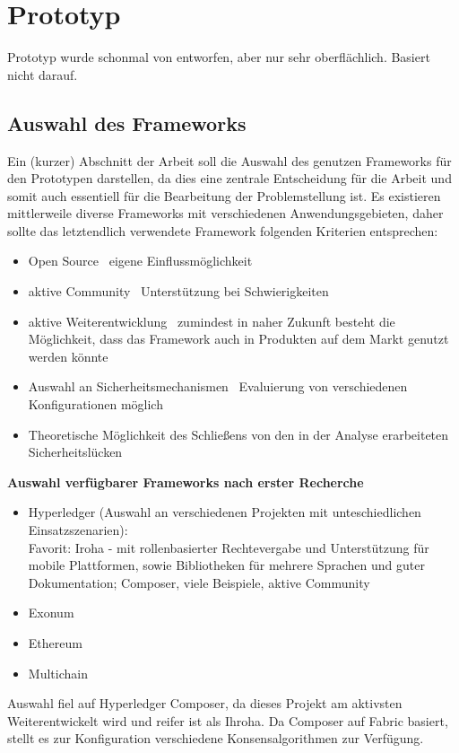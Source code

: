 \section{Prototyp}
\label{sec:prototype}

    Prototyp wurde schonmal von \cite{Han2017} entworfen, aber nur sehr oberflächlich.
    Basiert nicht darauf.

\subsection{Auswahl des Frameworks}
\label{sec:prototype_framework}
    Ein (kurzer) Abschnitt der Arbeit soll die Auswahl des genutzen Frameworks für den Prototypen darstellen, da dies eine zentrale Entscheidung für die Arbeit und somit auch essentiell für die Bearbeitung der Problemstellung ist.
    Es existieren mittlerweile diverse Frameworks mit verschiedenen Anwendungsgebieten, daher sollte das letztendlich verwendete Framework folgenden Kriterien entsprechen:
    \begin{itemize}
        \item Open Source \textrightarrow\ eigene Einflussmöglichkeit
        \item aktive Community \textrightarrow\ Unterstützung bei Schwierigkeiten
        \item aktive Weiterentwicklung \textrightarrow\ zumindest in naher Zukunft besteht die Möglichkeit, dass das Framework auch in Produkten auf dem Markt genutzt werden könnte
        \item Auswahl an Sicherheitsmechanismen \textrightarrow\ Evaluierung von verschiedenen Konfigurationen möglich
        \item Theoretische Möglichkeit des Schließens von den in der Analyse erarbeiteten Sicherheitslücken
    \end{itemize}
    \medskip
    \textbf{Auswahl verfügbarer Frameworks nach erster Recherche}
    \begin{itemize}
        \item Hyperledger (Auswahl an verschiedenen Projekten mit unteschiedlichen Einsatzszenarien):\\
            Favorit: Iroha - mit rollenbasierter Rechtevergabe und Unterstützung für mobile Plattformen, sowie Bibliotheken für mehrere Sprachen und guter Dokumentation; Composer, viele Beispiele, aktive Community
        \item Exonum
        \item Ethereum
        \item Multichain
    \end{itemize}
    Auswahl fiel auf Hyperledger Composer, da dieses Projekt am aktivsten Weiterentwickelt wird und reifer ist als Ihroha.
    Da Composer auf Fabric basiert, stellt es zur Konfiguration verschiedene Konsensalgorithmen zur Verfügung.

